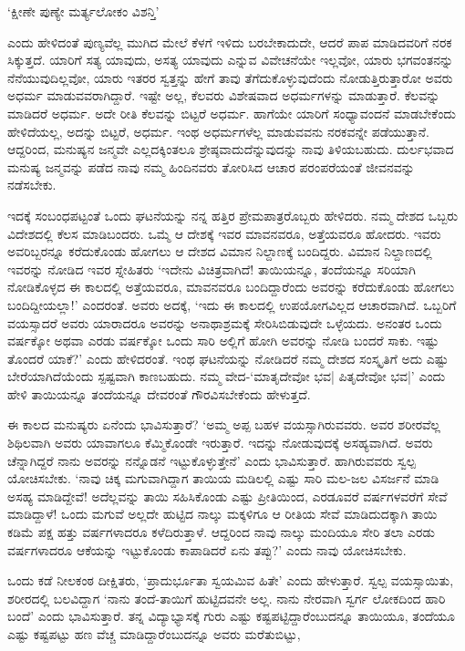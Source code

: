 \begin{shloka}
`ಕ್ಷೀಣೇ ಪುಣ್ಯೇ ಮರ್ತ್ಯಲೋಕಂ ವಿಶನ್ತಿ'
\end{shloka}

ಎಂದು ಹೇಳಿದಂತೆ ಪುಣ್ಯವೆಲ್ಲ ಮುಗಿದ ಮೇಲೆ ಕೆಳಗೆ ಇಳಿದು ಬರಬೇಕಾದುದೇ, ಆದರೆ ಪಾಪ ಮಾಡಿದವರಿಗೆ ನರಕ ಸಿಕ್ಕುತ್ತದೆ. ಯಾರಿಗೆ ಸತ್ಯ ಯಾವುದು, ಅಸತ್ಯ ಯಾವುದು ಎನ್ನುವ ವಿವೇಚನೆಯೇ ಇಲ್ಲವೋ, ಯಾರು ಭಗವಂತನನ್ನು ನೆನೆಯುವುದಿಲ್ಲವೋ, ಯಾರು ಇತರರ ಸ್ವತ್ತನ್ನು ಹೇಗೆ ತಾವು ತೆಗೆದುಕೊಳ್ಳುವುದೆಂದು ನೋಡುತ್ತಿರುತ್ತಾರೋ ಅವರು ಅಧರ್ಮ ಮಾಡುವವರಾಗಿದ್ದಾರೆ. ಇಷ್ಟೇ ಅಲ್ಲ, ಕೆಲವರು ವಿಶೇಷವಾದ ಅಧರ್ಮಗಳನ್ನು ಮಾಡುತ್ತಾರೆ. ಕೆಲವನ್ನು ಮಾಡಿದರೆ ಅಧರ್ಮ. ಅದೇ ರೀತಿ ಕೆಲವನ್ನು ಬಿಟ್ಟರೆ ಅಧರ್ಮ. ಹಾಗೆಯೇ ಯಾರಿಗೆ ಸಂಧ್ಯಾವಂದನೆ ಮಾಡಬೇಕೆಂದು ಹೇಳಿದೆಯಲ್ಲ, ಅದನ್ನು ಬಿಟ್ಟರೆ, ಅಧರ್ಮ. ಇಂಥ ಅಧರ್ಮಗಳೆಲ್ಲ ಮಾಡುವವನು ನರಕವನ್ನೇ ಪಡೆಯುತ್ತಾನೆ. ಆದ್ದರಿಂದ, ಮನುಷ್ಯನ ಜನ್ಮವೇ ಎಲ್ಲದಕ್ಕಿಂತಲೂ ಶ್ರೇಷ್ಠವಾದುದೆನ್ನುವುದನ್ನು ನಾವು ತಿಳಿಯಬಹುದು. ದುರ್ಲಭವಾದ ಮನುಷ್ಯ ಜನ್ಮವನ್ನು ಪಡೆದ ನಾವು ನಮ್ಮ ಹಿಂದಿನವರು ತೋರಿಸಿದ ಆಚಾರ ಪರಂಪರೆಯಂತೆ ಜೀವನವನ್ನು ನಡೆಸಬೇಕು.

ಇದಕ್ಕೆ ಸಂಬಂಧಪಟ್ಟಂತೆ ಒಂದು ಘಟನೆಯನ್ನು ನನ್ನ ಹತ್ತಿರ ಪ್ರೇಮಪಾತ್ರರೊಬ್ಬರು ಹೇಳಿದರು. ನಮ್ಮ ದೇಶದ ಒಬ್ಬರು ವಿದೇಶದಲ್ಲಿ ಕೆಲಸ ಮಾಡಿಬಂದರು. ಒಮ್ಮೆ ಆ ದೇಶಕ್ಕೆ ಇವರ ಮಾವನವರೂ, ಅತ್ತೆಯವರೂ ಹೋದರು. ಇವರು ಅವರಿಬ್ಬರನ್ನೂ ಕರೆದುಕೊಂಡು ಹೋಗಲು ಆ ದೇಶದ ವಿಮಾನ ನಿಲ್ದಾಣಕ್ಕೆ  ಬಂದಿದ್ದರು. ವಿಮಾನ ನಿಲ್ದಾಣದಲ್ಲಿ ಇವರನ್ನು ನೋಡಿದ ಇವರ ಸ್ನೇಹಿತರು `ಇದೇನು ವಿಚಿತ್ರವಾಗಿದೆ! ತಾಯಿಯನ್ನೂ, ತಂದೆಯನ್ನೂ ಸರಿಯಾಗಿ ನೋಡಿಕೊಳ್ಳದ ಈ ಕಾಲದಲ್ಲಿ ಅತ್ತೆಯವರೂ, ಮಾವನವರೂ ಬಂದಿದ್ದಾರೆಂದು ಅವರನ್ನು ಕರೆದುಕೊಂಡು ಹೋಗಲು ಬಂದಿದ್ದೀಯಲ್ಲಾ!' ಎಂದರಂತೆ. ಅವರು ಅದಕ್ಕೆ, `ಇದು ಈ ಕಾಲದಲ್ಲಿ ಉಪಯೋಗವಿಲ್ಲದ ಆಚಾರವಾಗಿದೆ. ಒಬ್ಬರಿಗೆ ವಯಸ್ಸಾದರೆ ಅವರು ಯಾರಾದರೂ ಅವರನ್ನು ಅನಾಥಾಶ್ರಮಕ್ಕೆ ಸೇರಿಸಿಬಿಡುವುದೇ ಒಳ್ಳೆಯದು. ಅನಂತರ ಒಂದು ವರ್ಷಕ್ಕೋ ಅಥವಾ ಎರಡು ವರ್ಷಕ್ಕೋ ಒಂದು ಸಾರಿ ಅಲ್ಲಿಗೆ ಹೋಗಿ ಅವರನ್ನು ನೋಡಿ ಬಂದರೆ ಸಾಕು. ಇಷ್ಟು ತೊಂದರೆ ಯಾಕೆ?' ಎಂದು ಹೇಳಿದರಂತೆ. ಇಂಥ ಘಟನೆಯನ್ನು ನೋಡಿದರೆ ನಮ್ಮ ದೇಶದ ಸಂಸ್ಕೃತಿಗೆ ಅದು ಎಷ್ಟು ಬೇರೆಯಾಗಿದೆಯೆಂದು ಸ್ಪಷ್ಟವಾಗಿ ಕಾಣಬಹುದು. ನಮ್ಮ ವೇದ-`ಮಾತೃದೇವೋ ಭವ| ಪಿತೃದೇವೋ ಭವ|' ಎಂದು ಹೇಳಿ ತಾಯಿಯನ್ನೂ ತಂದೆಯನ್ನೂ ದೇವರಂತೆ ಗೌರವಿಸಬೇಕೆಂದು ಹೇಳುತ್ತದೆ.

ಈ ಕಾಲದ ಮನುಷ್ಯರು ಏನೆಂದು ಭಾವಿಸುತ್ತಾರೆ? `ಅಮ್ಮ ಅಪ್ಪ ಬಹಳ ವಯಸ್ಸಾಗಿರುವವರು. ಅವರ ಶರೀರವೆಲ್ಲ ಶಿಥಿಲವಾಗಿ ಅವರು ಯಾವಾಗಲೂ ಕೆಮ್ಮಿಕೊಂಡೇ ಇರುತ್ತಾರೆ. ಇದನ್ನು ನೋಡುವುದಕ್ಕೆ ಅಸಹ್ಯವಾಗಿದೆ. ಅವರು ಚೆನ್ನಾಗಿದ್ದರೆ ನಾನು ಅವರನ್ನು ನನ್ನೊಡನೆ ಇಟ್ಟುಕೊಳ್ಳುತ್ತೇನೆ' ಎಂದು ಭಾವಿಸುತ್ತಾರೆ. ಹಾಗಿರುವವರು ಸ್ವಲ್ಪ ಯೋಚಿಸಬೇಕು. `ನಾವು ಚಿಕ್ಕ ಮಗುವಾಗಿದ್ದಾಗ ತಾಯಿಯ ಮಡಿಲಲ್ಲಿ ಎಷ್ಟು ಸಾರಿ ಮಲ-ಜಲ ವಿಸರ್ಜನೆ ಮಾಡಿ ಅಸಹ್ಯ ಮಾಡಿದ್ದೇವೆ! ಅದೆಲ್ಲವನ್ನು ತಾಯಿ ಸಹಿಸಿಕೊಂಡು ಎಷ್ಟು ಪ್ರೀತಿಯಿಂದ, ಎರಡೂವರೆ ವರ್ಷಗಳವರೆಗೆ ಸೇವೆ ಮಾಡಿದ್ದಾಳೆ! ಒಂದು ಮಗುವೆ ಅಲ್ಲದೇ ಹುಟ್ಟಿದ ನಾಲ್ಕು ಮಕ್ಕಳಿಗೂ ಆ ರೀತಿಯ ಸೇವೆ ಮಾಡಿದುದಕ್ಕಾಗಿ ತಾಯಿ ಕಡಿಮೆ ಪಕ್ಷ ಹತ್ತು ವರ್ಷಗಳಾದರೂ ಕಳೆದಿರುತ್ತಾಳೆ. ಆದ್ದರಿಂದ ನಾವು ನಾಲ್ಕು ಮಂದಿಯೂ ಸೇರಿ ತಲಾ ಎರಡು ವರ್ಷಗಳಾದರೂ ಆಕೆಯನ್ನು ಇಟ್ಟುಕೊಂಡು ಕಾಪಾಡಿದರೆ ಏನು ತಪ್ಪು?' ಎಂದು ನಾವು ಯೋಚಿಸಬೇಕು.

ಒಂದು ಕಡೆ ನೀಲಕಂಠ ದೀಕ್ಷಿತರು, `ಪ್ರಾದುರ್ಭೂತಾ ಸ್ವಯಮಿವ ಹಿತೇ' ಎಂದು ಹೇಳುತ್ತಾರೆ. ಸ್ವಲ್ಪ ವಯಸ್ಸಾಯಿತು, ಶರೀರದಲ್ಲಿ ಬಲವಿದ್ದಾಗ `ನಾನು ತಂದೆ-ತಾಯಿಗೆ ಹುಟ್ಟಿದವನೇ ಅಲ್ಲ. ನಾನು ನೇರವಾಗಿ ಸ್ವರ್ಗ ಲೋಕದಿಂದ ಹಾರಿ ಬಂದೆ' ಎಂದು ಭಾವಿಸುತ್ತಾರೆ. ತನ್ನ ವಿದ್ಯಾಭ್ಯಾಸಕ್ಕೆ ಗುರು ಎಷ್ಟು ಕಷ್ಟಪಟ್ಟಿದ್ದಾರೆಂಬುದನ್ನೂ ತಾಯಿಯೂ, ತಂದೆಯೂ ಎಷ್ಟು ಕಷ್ಟಪಟ್ಟು ಹಣ ವೆಚ್ಚ ಮಾಡಿದ್ದಾರೆಂಬುದನ್ನೂ ಅವರು ಮರೆತುಬಿಟ್ಟು,

